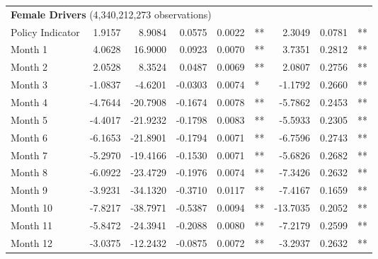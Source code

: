 \begin{table}
\begin{tabular}{l r r r r l r r l}
\hline 

\multicolumn{7}{l}{\textbf{Female Drivers} (4,340,212,273 observations)} \\ 

Policy Indicator          &  1.9157        &  8.9084       &  0.0575        &  0.0022       &   **       &  2.3049        &  0.0781       &   **       \\ 
Month 1                         &  4.0628        &  16.9000       &  0.0923        &  0.0070       &   **       &  3.7351        &  0.2812       &   **       \\ 
Month 2                         &  2.0528        &  8.3524       &  0.0487        &  0.0069       &   **       &  2.0807        &  0.2756       &   **       \\ 
Month 3                         &  -1.0837        &  -4.6201       &  -0.0303        &  0.0074       &    *       &  -1.1792        &  0.2660       &   **       \\ 
Month 4                         &  -4.7644        &  -20.7908       &  -0.1674        &  0.0078       &   **       &  -5.7862        &  0.2453       &   **       \\ 
Month 5                         &  -4.4017        &  -21.9232       &  -0.1798        &  0.0083       &   **       &  -5.5933        &  0.2305       &   **       \\ 
Month 6                         &  -6.1653        &  -21.8901       &  -0.1794        &  0.0071       &   **       &  -6.7596        &  0.2743       &   **       \\ 
Month 7                         &  -5.2970        &  -19.4166       &  -0.1530        &  0.0071       &   **       &  -5.6826        &  0.2682       &   **       \\ 
Month 8                         &  -6.0922        &  -23.4729       &  -0.1976        &  0.0074       &   **       &  -7.3426        &  0.2632       &   **       \\ 
Month 9                         &  -3.9231        &  -34.1320       &  -0.3710        &  0.0117       &   **       &  -7.4167        &  0.1659       &   **       \\ 
Month 10                        &  -7.8217        &  -38.7971       &  -0.5387        &  0.0094       &   **       &  -13.7035        &  0.2052       &   **       \\ 
Month 11                        &  -5.8472        &  -24.3941       &  -0.2088        &  0.0080       &   **       &  -7.2179        &  0.2599       &   **       \\ 
Month 12                        &  -3.0375        &  -12.2432       &  -0.0875        &  0.0072       &   **       &  -3.2937        &  0.2632       &   **       \\ 


\end{tabular}
\end{table}
